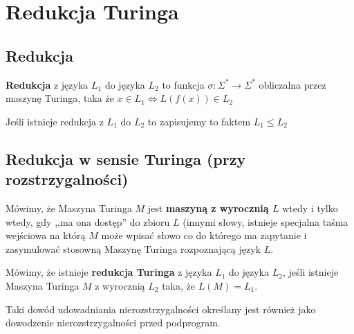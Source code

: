\section{Redukcja Turinga}

\subsection{Redukcja} 

\begin{definition}

    \textbf{Redukcja} z języka \( L_1 \) do języka \( L_2 \) to funkcja \( \sigma: \Sigma^* \rightarrow \Sigma^*\) obliczalna przez maszynę Turinga, taka że \( x \in L_1 \iff L(f(x)) \in L_2 \)
    
    Jeśli istnieje redukcja z \( L_1 \) do \( L_2 \) to zapisujemy to faktem \( L_1 \leq L_2 \)
\end{definition}

\subsection{Redukcja w sensie Turinga (przy rozstrzygalności)}

\begin{definition}
    Mówimy, że Maszyna Turinga \(M\) jest \textbf{maszyną z wyrocznią \(L\)} wtedy i tylko wtedy, gdy ,,ma ona dostęp'' do zbioru \(L\) (innymi słowy, istnieje specjalna taśma wejściowa na którą \(M\) może wpisać słowo co do którego ma zapytanie i zasymulować stosowną Maszynę Turinga rozpoznającą język \(L\). 
\end{definition}

\begin{definition}
    Mówimy, że istnieje \textbf{redukcja Turinga} z języka \(L_1 \) do języka \( L_2\), jeśli istnieje Maszyna Turinga \(M\) z wyrocznią \(L_2\) taka, że \(L(M) = L_1\). 
    
    Taki dowód udowadniania nierozstrzygalności określany jest również jako dowodzenie nierozstrzygalności przed podprogram.
\end{definition}
